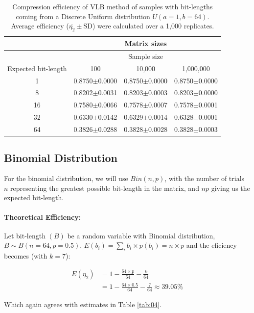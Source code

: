 \documentclass[10pt]{article}
\begin{document}
\begin{table}[h]
  \centering
  \caption{Compression efficiency of VLB method of samples with bit-lengths coming from a Discrete Uniform distribution $U(a=1,b=64)$. Average efficiency ($\overline{\eta_2}\pm\textrm{SD}$) were calculated over a 1,000 replicates.}
 \begin{tabular}{cccc}
    \hline
    & &Matrix sizes& \\
    \hline
    & &Sample size & \\
    Expected bit-length & 100 & 10,000 & 1,000,000 \\
    \hline
     1&0.8750$\pm$0.0000& 0.8750$\pm$0.0000&0.8750$\pm$0.0000\\ 
     8&0.8202$\pm$0.0031& 0.8203$\pm$0.0003&0.8203$\pm$0.0000\\ 
     16&0.7580$\pm$0.0066& 0.7578$\pm$0.0007&0.7578$\pm$0.0001\\ 
     32&0.6330$\pm$0.0142& 0.6329$\pm$0.0014&0.6328$\pm$0.0001\\ 
     64&0.3826$\pm$0.0288& 0.3828$\pm$0.0028&0.3828$\pm$0.0003\\ 
    \hline
 \end{tabular}
 \label{tab:03}
\end{table}

\subsection*{Binomial Distribution}

For the binomial distribution, we will use $Bin(n, p)$, with the number of trials $n$ representing the greatest possible bit-length in the matrix, and $np$ giving us the expected bit-length.

\paragraph{Theoretical Efficiency:}
Let bit-length $(B)$ be a random variable with Binomial distribution, $B \sim B(n=64,p=0.5)$, $E(b_i) = \sum_{i} b_i \times p(b_i) = n \times p$ and the eficiency becomes (with $k=7$):

\begin{align}\label{eq:47}
 E(\eta_2) &= 1 - \frac{64 \times p }{64} - \frac{k}{64}  \\
  &= 1 - \frac{64 \times 0.5 }{64} - \frac{7}{64} \approx 39.05\% \nonumber
\end{align}

Which again agrees with estimates in Table \ref{tab:04}.
\end{document}
